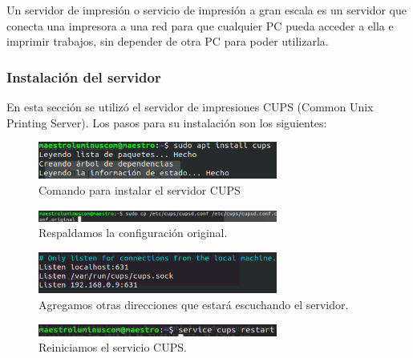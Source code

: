 Un servidor de impresión o servicio de impresión a gran escala es un servidor que conecta una impresora a una red para que cualquier PC pueda acceder a ella e imprimir trabajos, sin depender de otra PC para poder utilizarla.
\subsubsection{Instalación del servidor}
En esta sección se utilizó el servidor de impresiones CUPS (Common Unix Printing Server). Los pasos para su instalación son los siguientes:
\begin{figure}[!htbp]
	\hypertarget{fig:instalacionCUPS}{\hspace{1pt}}
	\begin{center}
		\includegraphics[width=0.7\textwidth]{desarrollo/tarea2/img/instalacionCUPS.png}
		\caption{Comando para instalar el servidor CUPS}
		\label{fig:instalacionCUPS}
	\end{center}
\end{figure}
\pagebreak
\begin{figure}[!htbp]
	\hypertarget{fig:respaldoCUPS}{\hspace{1pt}}
	\begin{center}
		\includegraphics[width=0.7\textwidth]{desarrollo/tarea2/img/respaldoCUPS.png}
		\caption{Respaldamos la configuración original.}
		\label{fig:respaldoCUPS}
	\end{center}
\end{figure}
\pagebreak
\begin{figure}[!htbp]
	\hypertarget{fig:configCUPS}{\hspace{1pt}}
	\begin{center}
		\includegraphics[width=0.7\textwidth]{desarrollo/tarea2/img/configCUPS.png}
		\caption{Agregamos otras direcciones que estará escuchando el servidor.}
		\label{fig:configCUPS}
	\end{center}
\end{figure}
\pagebreak
\begin{figure}[!htbp]
	\hypertarget{fig:reinicioCUPS}{\hspace{1pt}}
	\begin{center}
		\includegraphics[width=0.7\textwidth]{desarrollo/tarea2/img/reinicioCUPS.png}
		\caption{Reiniciamos el servicio CUPS.}
		\label{fig:reinicioCUPS}
	\end{center}
\end{figure}